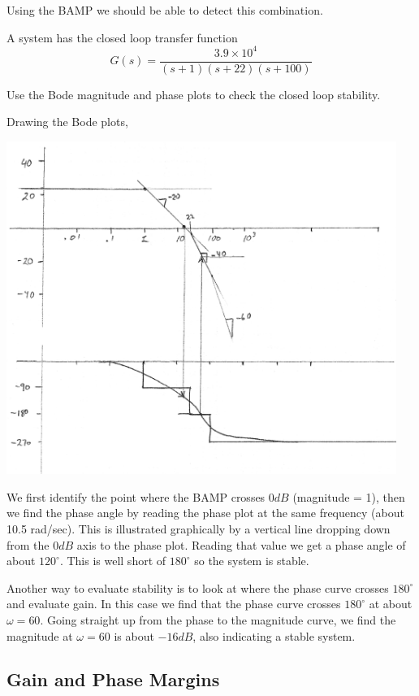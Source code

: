 Using the BAMP we should be able to detect this combination.

\begin{ExampleSmall}\label{bodestabilityexample}
A system has the closed loop transfer function
\[
G(s) = \frac {3.9\times 10^4} {(s+1)(s+22)(s+100)}
\]

Use the Bode magnitude and phase plots to check the closed loop stability.   

Drawing the Bode plots,

\includegraphics[width=5.0in]{figs06/00794aa.png}

We first identify the point where the BAMP crosses 0$dB$ (magnitude = 1), then we find the phase angle by reading the phase plot at the same frequency (about 10.5 rad/sec).   This is illustrated graphically by a vertical line dropping down from the $0dB$ axis to the phase plot.  Reading that value we get a phase angle of about $120^\circ$.  This is well short of $180^\circ$ so the system is stable.

Another way to evaluate stability is to look at where the phase curve crosses $180^\circ$ and evaluate gain.  In this case we find that the phase curve crosses $180^\circ$ at about $\omega=60$.  Going straight up from the phase to the magnitude curve, we find the magnitude at $\omega = 60$ is about $-16dB$, also indicating a stable system.
\end{ExampleSmall}

\subsection{Gain and Phase Margins}\label{GainPhaseMargins}

